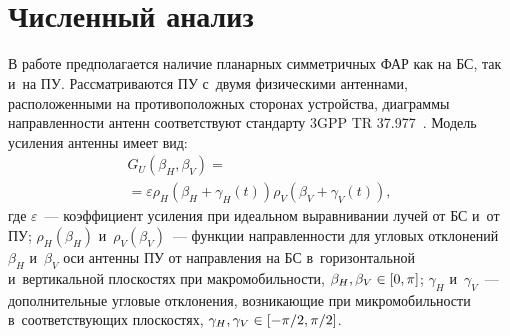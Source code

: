 \begin{multicols}{2}
\setcounter{figure}{1}
\begin{figure*}[b] %
\vspace*{1pt}
\begin{minipage}[t]{80mm}
      \begin{center}
     \mbox{%
\epsfxsize=79mm 
}
\end{center}
\vspace*{-9pt}
\end{minipage}
\hfill
\vspace*{1pt}
\begin{minipage}[t]{80mm}
      \begin{center}
     \mbox{%
\epsfxsize=79mm 
}
\end{center}
\vspace*{-9pt}
\end{minipage}
\end{figure*}

 

\section{Численный анализ}

  В работе предполагается наличие планарных симметричных ФАР как на БС, 
так и~на ПУ. Рассматриваются ПУ с~двумя физическими антеннами, 
расположенными на противоположных сторонах устройства, диаграммы 
направленности антенн соответствуют стандарту 3GPP TR 37.977~\cite{17-ost}. 
Модель усиления антенны имеет вид:
  \begin{multline}
  G_U(\beta_H, \beta_V) ={}\\
  {}=\varepsilon \rho_H \left(\beta_H+\gamma_H(t)\right) 
\rho_V \left(\beta_V+\gamma_V(t)\right),
  \label{e7-ost}
  \end{multline}
где $\varepsilon$~--- коэффициент усиления при идеальном 
выравнивании лучей от БС и~от ПУ; $\rho_H(\beta_H)$ и~$\rho_V(\beta_V)$~--- функции направленности для угловых 
отклонений~$\beta_H$ и~$\beta_V$ оси антенны ПУ от направления на БС 
в~горизонтальной и~вертикальной плоскостях при макромобильности, $\beta_H, 
\beta_V\hm\in [0,\pi]$; $\gamma_H$ и~$\gamma_V$~--- дополнительные угловые 
отклонения, воз\-ни\-ка\-ющие при микромобильности в~со\-от\-вет\-ст\-ву\-ющих 
плоскостях,  $\gamma_H, \gamma_V\hm\in [-\pi/2,\pi/2]$.
  

\end{multicols}
